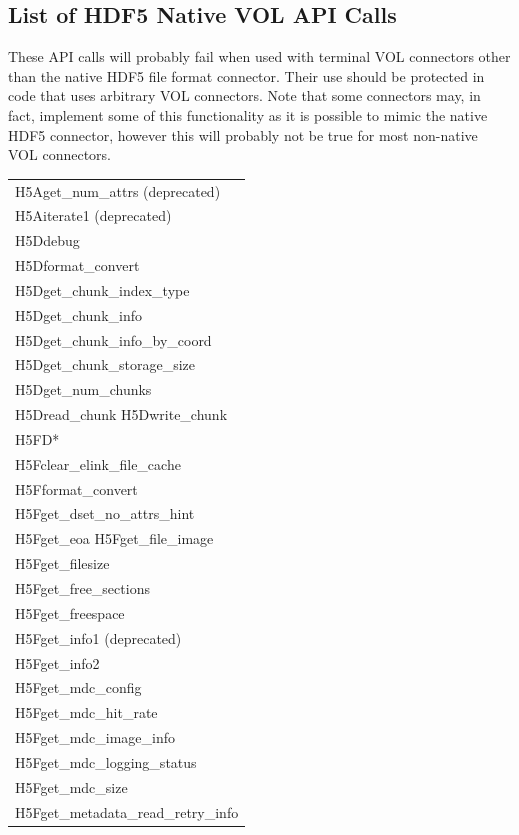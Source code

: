 \subsection{List of HDF5 Native VOL API Calls}

These API calls will probably fail when used with terminal VOL connectors other than the native HDF5 file format connector. Their use should be protected in code that uses arbitrary VOL connectors. Note that some connectors may, in fact, implement some of this functionality as it is possible to mimic the native HDF5 connector, however this will probably not be true for most non-native VOL connectors.

\begin{longtable}{ |>{\raggedright\arraybackslash}p{\linewidth}| }
    \hline
    H5Aget\_num\_attrs (deprecated) \\
    H5Aiterate1 (deprecated) \\
    \hline
    H5Ddebug \\
    H5Dformat\_convert \\
    H5Dget\_chunk\_index\_type \\
    H5Dget\_chunk\_info \\
    H5Dget\_chunk\_info\_by\_coord \\
    H5Dget\_chunk\_storage\_size \\
    H5Dget\_num\_chunks \\
    H5Dread\_chunk H5Dwrite\_chunk \\
    \hline
    H5FD* \\
    \hline
    H5Fclear\_elink\_file\_cache \\
    H5Fformat\_convert \\
    H5Fget\_dset\_no\_attrs\_hint \\
    H5Fget\_eoa H5Fget\_file\_image \\
    H5Fget\_filesize \\
    H5Fget\_free\_sections \\
    H5Fget\_freespace \\
    H5Fget\_info1 (deprecated) \\
    H5Fget\_info2 \\
    H5Fget\_mdc\_config \\
    H5Fget\_mdc\_hit\_rate \\
    H5Fget\_mdc\_image\_info \\
    H5Fget\_mdc\_logging\_status \\
    H5Fget\_mdc\_size \\
    H5Fget\_metadata\_read\_retry\_info \\

\end{longtable}
